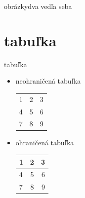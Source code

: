 \documentclass{beamer}
\begin{document}
\begin{frame}{obrázky}{dva vedľa seba}

\begin{figure}
	\centering
      \qquad
\end{figure}

\end{frame}

\section{tabuľka}

\begin{frame}{tabuľka}

\begin{itemize} 
    \item neohraničená tabuľka \\
            \vspace{2em}
        \begin{tabular}{ l c r }
          1 & 2 & 3 \\
          4 & 5 & 6 \\
          7 & 8 & 9 \\
        \end{tabular}
        \vspace{2em}
    \item ohraničená tabuľka \\
            \vspace{2em}
                \begin{tabular}{| l | c | r | }
                \hline
          1 & 2 & 3 \\ \hline
          4 & 5 & 6 \\ \hline
          7 & 8 & 9 \\
          \hline
        \end{tabular}
\end{itemize}

\end{frame}


\end{document}
